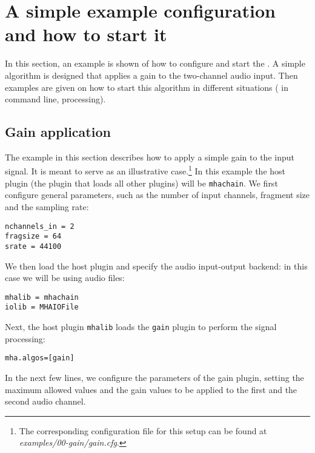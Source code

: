 
\section{A simple example configuration and how to start it}%
\label{sec:scenarios}%
%
%
%

In this section, an example is shown of how to configure and start the
\mha{}. A simple algorithm is designed that applies a gain to the two-channel audio input.
Then examples are given on how to start this algorithm in different situations (\mhad{} in command line, \Matlab{} processing).

\subsection{Gain application}%
\label{sec:dyncmp}%

The example in this section describes how to apply a simple gain to the input signal.
It is meant to serve as an illustrative case.\footnote{
  The corresponding configuration file for this setup can be found at
  \emph{examples/00-gain/gain.cfg}.
}
%
In this example the host plugin (the plugin that loads all other
plugins) will be \verb!mhachain!.
%
We first configure general parameters, such as the number of input 
channels, fragment size and the sampling rate:
\begin{verbatim}
nchannels_in = 2
fragsize = 64
srate = 44100
\end{verbatim}
%
We then load the host plugin and specify the audio input-output backend:
in this case we will be using audio files:
\begin{verbatim}
mhalib = mhachain
iolib = MHAIOFile
\end{verbatim}
%
Next, the host plugin \verb!mhalib! loads the \verb!gain! plugin
to perform the signal processing:
\begin{verbatim}
mha.algos=[gain]
\end{verbatim}
%
In the next few lines, we configure the parameters of the gain
plugin, setting the maximum allowed values and the gain values to be applied to the first and the second audio channel. 
%

